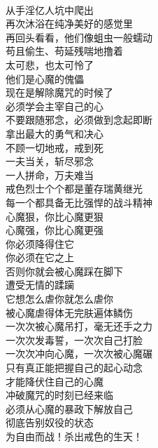 \begin{poem}[冲破手淫的魔咒]
    \begin{multicols}{2}
        \centering~\\
        从手淫亿人坑中爬出 \\ 再次沐浴在纯净美好的感觉里 \\ 再回头看看，他们像蛆虫一般蠕动 \\ 苟且偷生、苟延残喘地撸着 \\ 太可悲，也太可怜了 \\ 他们是心魔的傀儡 \\ 现在是解除魔咒的时候了 \\ 必须学会主宰自己的心 \\ 不要跟随邪念，必须做到念起即断 \\ 拿出最大的勇气和决心 \\ 不顾一切地戒，戒到死 \\ 一夫当关，斩尽邪念 \\ 一人拼命，万夫难当 \\ 戒色烈士个个都是董存瑞黄继光 \\ 每一个都具备无比强悍的战斗精神 \\ 心魔狠，你比心魔更狠 \\ 心魔强，你比心魔更强 \\ 你必须降得住它 \\ 你必须在它之上 \\ 否则你就会被心魔踩在脚下 \\ 遭受无情的蹂躏 \\ 它想怎么虐你就怎么虐你 \\ 被心魔虐得体无完肤遍体鳞伤 \\ 一次次被心魔吊打，毫无还手之力 \\ 一次次发毒誓，一次次自己打脸 \\ 一次次冲向心魔，一次次被心魔碾 \\ 只有真正能把握自己的起心动念 \\ 才能降伏住自己的心魔 \\ 冲破魔咒的时刻已经来临 \\ 必须从心魔的暴政下解放自己 \\ 彻底告别奴役的状态 \\ 为自由而战！杀出戒色的生天！
    \end{multicols}
\end{poem}

